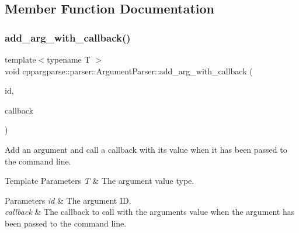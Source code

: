 \subsection{Member Function Documentation}
\mbox{\label{classcppargparse_1_1parser_1_1ArgumentParser_aad667a38fb847cd48b15f66cb99c1818}} 
\subsubsection{\texorpdfstring{add\+\_\+arg\+\_\+with\+\_\+callback()}{add\_arg\_with\_callback()}\hspace{0.1cm}{\footnotesize\ttfamily [1/3]}}
{\footnotesize\ttfamily template$<$typename T $>$ \\
void cppargparse\+::parser\+::\+Argument\+Parser\+::add\+\_\+arg\+\_\+with\+\_\+callback (\begin{DoxyParamCaption}\item[{const std\+::string \&}]{id,  }\item[{const std\+::function$<$ void(const \hyperlink{classcppargparse_1_1parser_1_1ArgumentParser}{Argument\+Parser} \&, const T \&)$>$ \&}]{callback }\end{DoxyParamCaption})\hspace{0.3cm}{\ttfamily [inline]}}



Add an argument and call a callback with its value when it has been passed to the command line. 


\begin{DoxyTemplParams}{Template Parameters}
{\em T} & The argument value type.\\
\hline
\end{DoxyTemplParams}

\begin{DoxyParams}{Parameters}
{\em id} & The argument ID. \\
\hline
{\em callback} & The callback to call with the argument\textquotesingle{}s value when the argument has been passed to the command line.\\
\hline
\end{DoxyParams}

